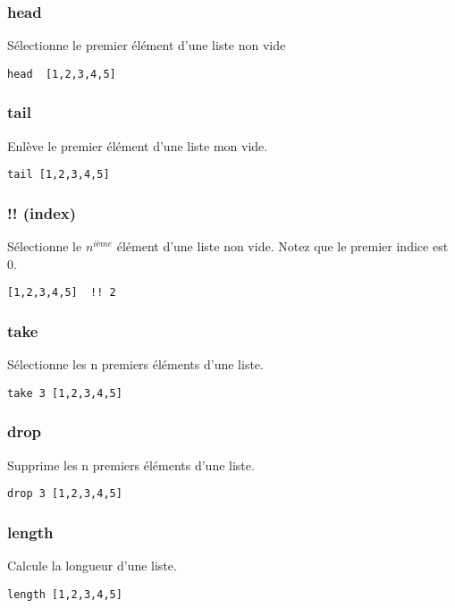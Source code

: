 \documentclass[11pt]{article}
\begin{document}
\subsubsection{head}
\label{sec:org625350d}
Sélectionne le premier élément d'une liste non vide

\begin{verbatim}
head  [1,2,3,4,5]
\end{verbatim}

\subsubsection{tail}
\label{sec:orge3ce91f}
Enlève le premier élément d'une liste  mon vide.
\begin{verbatim}
tail [1,2,3,4,5]
\end{verbatim}

\subsubsection{!! (index)}
\label{sec:orgcdbcaaa}
Sélectionne le \(n^{ième}\) élément d'une liste non vide.   Notez que le premier indice est 0.
\begin{verbatim}
[1,2,3,4,5]  !! 2
\end{verbatim}

\subsubsection{take}
\label{sec:org0365f96}
Sélectionne les n premiers éléments d'une liste.
\begin{verbatim}
take 3 [1,2,3,4,5]
\end{verbatim}

\subsubsection{drop}
\label{sec:org54f84fc}
Supprime les n premiers éléments d'une liste.
\begin{verbatim}
drop 3 [1,2,3,4,5]
\end{verbatim}

\subsubsection{length}
\label{sec:org38534bc}
Calcule la longueur d'une liste.
\begin{verbatim}
length [1,2,3,4,5]
\end{verbatim}
\end{document}

